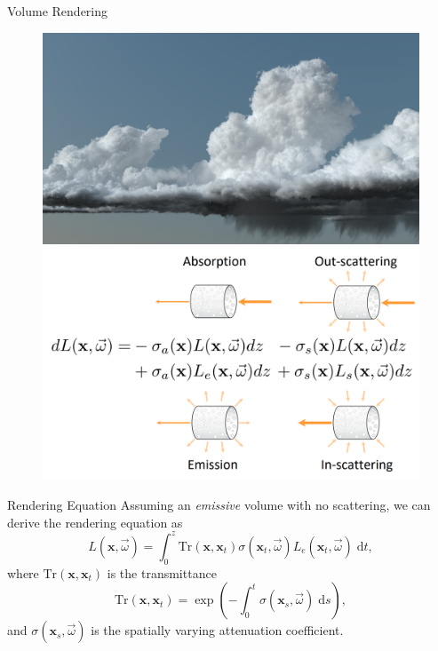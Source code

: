 \documentclass[10pt]{beamer}
\newcommand{\bx}{\mathbf{x}}
\begin{document}
{
\begin{frame}{Volume Rendering}
    \begin{figure}
        \centering
        \includegraphics[width=0.6\linewidth]{figures/vol/volume.png} \\ \vspace{0.5em}
        \includegraphics[width=0.5\linewidth]{figures/vol/rte.png}
    \end{figure}
\end{frame}
}

\begin{frame}{Rendering Equation}
    Assuming an \emph{emissive} volume with no scattering, we can derive the \alert{rendering equation} as
    \begin{equation*}
        L(\bx, \vec{\omega}) = \int_0^z \mathrm{Tr}(\bx, \bx_t) \sigma(\bx_t, \vec{\omega}) L_e(\bx_t, \vec{\omega})  \; \mathrm{d}t,
    \end{equation*}
    where \(\mathrm{Tr}(\bx, \bx_t)\) is the \alert{transmittance}
    \begin{equation*}
        \mathrm{Tr}(\bx, \bx_t) = \exp\left(-\int_0^t \sigma(\bx_s, \vec{\omega}) \;\mathrm{d}s\right),
    \end{equation*}
    and \(\sigma(\bx_s, \vec{\omega})\) is the spatially varying \alert{attenuation coefficient}.
\end{frame}
\end{document}
